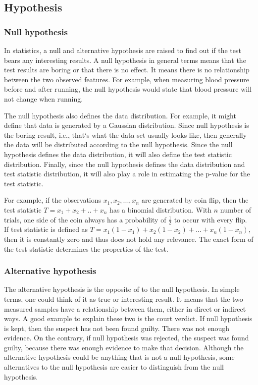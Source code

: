\documentclass[12pt]{article}
\begin{document}
{\subsection{Hypothesis}

\subsubsection{Null hypothesis}

In statistics, a null and alternative hypothesis are raised to find out if the test bears any interesting results. A null hypothesis in general terms means that the test results are boring or that there is no effect. It means there is no relationship between the two observed features. For example, when measuring blood pressure before and after running, the null hypothesis would state that blood pressure will not change when running.

The null hypothesis also defines the data distribution. For example, it might define that data is generated by a Gaussian distribution. Since null hypothesis is the boring result, i.e., that`s what the data set usually looks like, then generally the data will be distributed according to the null hypothesis. Since the null hypothesis defines the data distribution, it will also define the test statistic distribution. Finally, since the null hypothesis defines the data distribution and test statistic distribution, it will also play a role in estimating the p-value for the test statistic.

For example, if the observations $x_1, x_2, ..., x_n$ are generated by coin flip, then the test statistic $T=x_1 + x_2 + .. + x_n$ has a binomial distribution. With $n$ number of trials, one side of the coin always has a probability of $\frac{1}{2}$ to occur with every flip. If test statistic is defined as $T=x_1(1-x_1) + x_2(1-x_2) + ... + x_n(1-x_n)$, then it is constantly zero and thus does not hold any relevance. The exact form of the test statistic determines the properties of the test.

\subsubsection{Alternative hypothesis}
The alternative hypothesis is the opposite of to the null hypothesis. In simple terms, one could think of it as true or interesting result. It means that the two measured samples have a relationship between them, either in direct or indirect ways. A good example to explain these two is the court verdict. If null hypothesis is kept, then the suspect has not been found guilty. There was not enough evidence. On the contrary, if null hypothesis was rejected, the suspect was found guilty, because there was enough evidence to make that decision. Although the alternative hypothesis could be anything that is not a null hypothesis, some alternatives to the null hypothesis are easier to distinguish from the null hypothesis.

}
\end{document}
